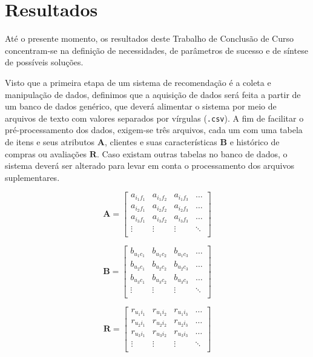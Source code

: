 \chapter[Resultados]{Resultados}
\label{chap:resultados}

Até o presente momento, os resultados deste Trabalho de Conclusão de Curso concentram-se na definição de necessidades, de parâmetros de sucesso e de síntese de possíveis soluções. 

Visto que a primeira etapa de um sistema de recomendação é a coleta e manipulação de dados, definimos que a aquisição de dados será feita a partir de um banco de dados genérico, que deverá alimentar o sistema por meio de arquivos de texto com valores separados por vírgulas (\texttt{.csv}). A fim de facilitar o pré-processamento dos dados, exigem-se três arquivos, cada um com uma tabela de itens e seus atributos $\mathbf{A}$, clientes e suas características $\mathbf{B}$ e histórico de compras ou avaliações $\mathbf{R}$. Caso existam outras tabelas no banco de dados, o sistema deverá ser alterado para levar em conta o processamento dos arquivos suplementares.

\begin{equation} 
\mathbf{A} = 
\begin{bmatrix} 
 a_{i_1 f_1} &  a_{i_1 f_2} &  a_{i_1 f_3}  & \dots   \\
 a_{i_2 f_1} &  a_{i_2 f_2} &  a_{i_2 f_3}  & \dots   \\
 a_{i_3 f_1} &  a_{i_3 f_2} &  a_{i_3 f_3}  & \dots  \\ 
 \vdots &  \vdots &  \vdots  & \ddots   \\
 \end{bmatrix}
\end{equation}

\begin{equation}
	\mathbf{B} = 
\begin{bmatrix} 
 b_{u_1 c_1} &  b_{u_1 c_2} &  b_{u_1 c_3}  & \dots   \\
 b_{u_2 c_1} &  b_{u_2 c_2} &  b_{u_2 c_3}  & \dots   \\
 b_{u_3 c_1} &  b_{u_3 c_2} &  b_{u_3 c_3}  & \dots  \\ 
 \vdots &  \vdots &  \vdots  & \ddots   \\
 \end{bmatrix}
\end{equation}

\begin{equation}
	  \mathbf{R} = 
\begin{bmatrix} 
  r_{u_1 i_1} &  r_{u_1 i_2} &  r_{u_1 i_3}  & \dots   \\
 r_{u_2 i_1} &  r_{u_2 i_2} &  r_{u_2 i_3}  & \dots   \\
 r_{u_3 i_1} &  r_{u_3 i_2} &  r_{u_3 i_3}  & \dots  \\ 
 \vdots &  \vdots &  \vdots  & \ddots   \\
\end{bmatrix}
\end{equation}

